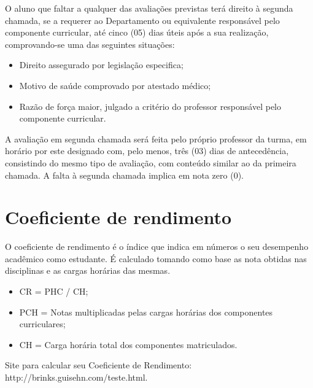 O aluno que faltar a qualquer das avaliações previstas terá direito à segunda chamada, se a requerer ao Departamento ou equivalente responsável pelo componente curricular, até cinco (05) dias úteis após a sua realização, comprovando-se uma das seguintes situações:
    \begin{itemize}
        \item Direito assegurado por legislação especifica;
        \item Motivo de saúde comprovado por atestado médico;
        \item Razão de força maior, julgado a critério do professor responsável pelo componente curricular.
    \end{itemize}
    A avaliação em segunda chamada será feita pelo próprio professor da turma, em horário por este designado com, pelo menos, três (03) dias de antecedência, consistindo do mesmo tipo de avaliação, com conteúdo similar ao da primeira chamada. A falta à segunda chamada implica em nota zero (0).
    
\section{Coeficiente de rendimento} 

O coeficiente de rendimento é o índice que indica em números o seu desempenho acadêmico como estudante. É calculado tomando como base as nota obtidas nas disciplinas e as cargas horárias das mesmas.
\begin{itemize}
    \item CR =  PHC / CH;
    \item PCH = Notas multiplicadas pelas cargas horárias dos componentes curriculares;
    \item CH = Carga horária total dos componentes matriculados.
\end{itemize}
Site para calcular seu Coeficiente de Rendimento: http://brinks.guisehn.com/teste.html.